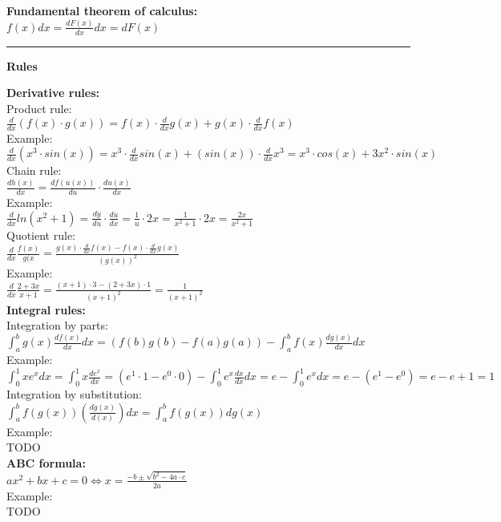 \documentclass[12pt,a4paper]{report}
\begin{document}
	\textbf{Fundamental theorem of calculus:}\\
	$f(x)dx = \frac{dF(x)}{dx}dx = dF(x)$

	\rule{17cm}{1pt}

	\begin{center}\textbf{Rules}\end{center}
	
	\textbf{Derivative rules:}\\
	Product rule:\\
	$\frac{d}{dx}(f(x) \cdot g(x)) = f(x) \cdot \frac{d}{dx}g(x) + g(x) \cdot \frac{d}{dx}f(x)$\\
	Example:\\
	$\frac{d}{dx}(x^3 \cdot sin(x)) = x^3 \cdot \frac{d}{dx} sin(x) + (sin (x)) \cdot \frac{d}{dx} x^3 = x^3 \cdot cos(x) + 3x^2 \cdot sin(x)$\\
	Chain rule:\\
	$\frac{dh(x)}{dx} = \frac{df(u(x))}{du} \cdot \frac{du(x)}{dx}$\\
	Example:\\
	$\frac{d}{dx} ln(x^2 + 1) = \frac{dy}{du} \cdot \frac{du}{dx} = \frac{1}{u} \cdot 2x = \frac{1}{x^2 +1} \cdot 2x = \frac{2x}{x^2 + 1}$\\
	Quotient rule:\\
	$\frac{d}{dx}\frac{f(x)}{g(x} = \frac{g(x) \cdot \frac{d}{dx} f(x) - f(x) \cdot \frac{d}{dx}g(x)}{(g(x))^2}$\\
	Example:\\
	$\frac{d}{dx}\frac{2+3x}{x+1} = \frac{(x+1)\cdot3-(2+3x)\cdot1}{(x+1)^2} = \frac{1}{(x+1)^2}$\\
	
	\textbf{Integral rules:}\\
	Integration by parts:\\
	$\int_{a}^{b} g(x) \frac{df(x)}{dx} dx = (f(b)g(b) - f(a)g(a)) - \int_{a}^{b} f(x) \frac{dg(x)}{dx}dx$\\
	Example:\\
	$\int_{0}^{1} xe^x dx = \int_{0}^{1} x \frac{d e^x}{dx} = (e^1 \cdot 1 - e^0 \cdot 0) - \int_{0}^{1} e^x \frac{dx}{dx}dx = e - \int_{0}^{1} e^x dx = e - (e^1 - e^0) = e - e+1 = 1$\\
	Integration by substitution:\\
	$\int_{a}^{b} f(g(x)) (\frac{dg(x)}{d(x)}) dx = \int_{a}^{b} f(g(x)) dg(x)$\\
	Example:\\
	TODO\\
	\textbf{ABC formula:}\\
	$ax^2 + bx + c = 0 \iff x = \frac{-b \pm \sqrt{b^2 - 4a \cdot c}}{2a}$\\
	Example:\\
	TODO\\
	
\end{document}
